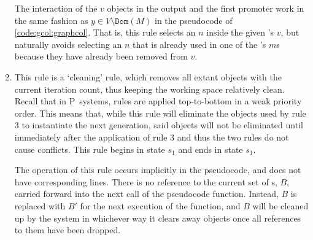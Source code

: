 \begin{enumerate}

The interaction of the \(v\) objects in the output and the first promoter work in the same fashion as \(y \in V \setminus \texttt{Dom}(M)\) in the pseudocode of \autoref{code:gcol:graphcol}.  That is, this rule selects an \(n\) inside the given \bo{}'s \(v\), but naturally avoids selecting an \(n\) that is already used in one of the \bo{}'s \(m\)s because they have already been removed from \(v\).

\item This rule is a `cleaning' rule, which removes all extant \bo{} objects with the current iteration count, thus keeping the working space relatively clean.  Recall that in P~systems, rules are applied top-to-bottom in a  weak priority order.  This means that, while this rule will eliminate the \bo{} objects used by rule 3 to instantiate the next generation, said objects will not be eliminated until immediately after the application of rule 3 and thus the two rules do not cause conflicts.  This rule begins in state \(s_1\) and ends in state \(s_1\).

The operation of this rule occurs implicitly in the pseudocode, and does not have corresponding lines.  There is no reference to the current set of \bo{}s, \(B\), carried forward into the next call of the pseudocode function.  Instead, \(B\) is replaced with \(B'\) for the next execution of the function, and \(B\) will be cleaned up by the system in whichever way it clears away objects once all references to them have been dropped.



\end{enumerate}
